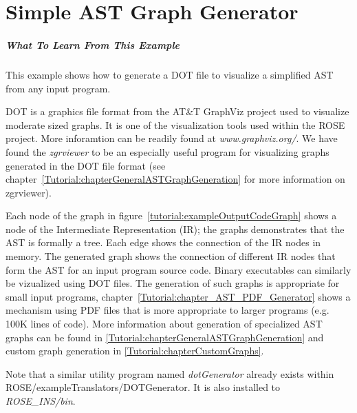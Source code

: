 \chapter{Simple AST Graph Generator}
\label{Tutorial:chapterASTGraphGenerator}

\paragraph{What To Learn From This Example}
This example shows how to generate a DOT file to visualize a simplified AST 
from any input program.
\vspace{0.25in}

   DOT is a graphics file format from the AT\&T GraphViz project used to 
visualize moderate sized graphs.  It is one of the visualization tools used within the
ROSE project.  More inforamtion can be readily found at {\em www.graphviz.org/}.
We have found the {\em zgrviewer} to be an especially useful program for 
visualizing graphs generated in the DOT file format (see 
chapter~\ref{Tutorial:chapterGeneralASTGraphGeneration} for more information 
on zgrviewer).

Each node of the graph in figure~\ref{tutorial:exampleOutputCodeGraph} shows
a node of the Intermediate Representation (IR); the graphs demonstrates that the 
AST is formally a tree.  Each edge shows the connection
of the IR nodes in memory. The generated graph shows the connection of different 
IR nodes that form the AST for an input program source code.  Binary executables
can similarly be vizualized using DOT files.
The generation of such graphs is appropriate for small 
input programs, chapter~\ref{Tutorial:chapter_AST_PDF_Generator} shows a mechanism 
using PDF files that is more appropriate to larger programs (e.g. 100K lines of code).
More information about generation of specialized AST graphs can be found in 
\ref{Tutorial:chapterGeneralASTGraphGeneration} and custom graph generation in
\ref{Tutorial:chapterCustomGraphs}.

Note that a similar utility program named \textit{dotGenerator} already exists within
ROSE/exampleTranslators/DOTGenerator. 
It is also installed to \textit{ROSE\_INS/bin}.

